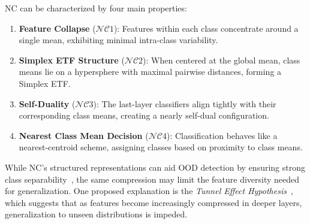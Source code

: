 NC can be characterized by four main properties:
\begin{enumerate}[noitemsep, nolistsep, leftmargin=*]
    \item \textbf{Feature Collapse} ($\mathcal{NC}1$): Features within each class concentrate around a single mean, exhibiting minimal intra-class variability.
    \item \textbf{Simplex ETF Structure} ($\mathcal{NC}2$): When centered at the global mean, class means lie on a hypersphere with maximal pairwise distances, forming a Simplex ETF.
    \item \textbf{Self-Duality} ($\mathcal{NC}3$): The last-layer classifiers align tightly with their corresponding class means, creating a nearly self-dual configuration.
    \item \textbf{Nearest Class Mean Decision} ($\mathcal{NC}4$): Classification behaves like a nearest-centroid scheme, assigning classes based on proximity to class means.
\end{enumerate}

While NC's structured representations can aid OOD detection by ensuring strong class separability~\cite{haas2023linking, wu2024pursuing}, the same compression may limit the feature diversity needed for generalization. One proposed explanation is the \emph{Tunnel Effect Hypothesis}~\cite{masarczyk2023tunnel}, which suggests that as features become increasingly compressed in deeper layers, generalization to unseen distributions is impeded. 


